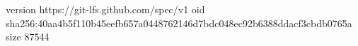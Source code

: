version https://git-lfs.github.com/spec/v1
oid sha256:40aa4b5f110b45eefb657a0448762146d7bdc048ec92b6388ddacf3cbdb0765a
size 87544
